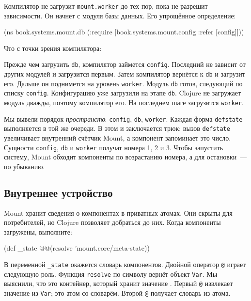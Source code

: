 
Компилятор не загрузит \verb|mount.worker| до тех пор, пока не разрешит
зависимости. Он начнет с модуля базы данных. Его упрощённое определение:

\begin{english}
  \begin{clojure}
(ns book.systems.mount.db
  (:require
   [book.systems.mount.config :refer [config]]))
  \end{clojure}
\end{english}

\noindent
Что с точки зрения компилятора:


Прежде чем загрузить \verb|db|, компилятор займется \verb|config|. Последний
не зависит от других модулей и загрузится первым. Затем компилятор вернётся к
\verb|db| и загрузит его. Дальше он поднимется на уровень
\verb|worker|. Модуль \verb|db| готов, следующий по списку
\verb|config|. Конфигурацию уже загрузили на этапе \verb|db|. Clojure не
загружает модуль дважды, поэтому компилятор его. На последнем шаге
загрузится \verb|worker|.


Мы вывели порядок \emph{пространств}: \verb|config|, \verb|db|,
\verb|worker|. Каждая форма \verb|defstate| выполняется в той же очереди. В
этом и заключается трюк: вызов \verb|defstate| увеличивает внутренний счётчик
Mount, а компонент запоминает это число. Сущности \verb|config|, \verb|db| и
\verb|worker| получат номера 1, 2 и 3. Чтобы запустить систему, Mount
обходит компоненты по возрастанию номера, а для остановки~--- по убыванию.

\subsection{Внутреннее устройство}

Mount хранит сведения о компонентах в приватных атомах. Они скрыты для
потребителей, но Clojure позволяет добраться до них. Когда компоненты загружены,
выполните:

\begin{english}
  \begin{clojure}
(def _state @@(resolve 'mount.core/meta-state))
  \end{clojure}
\end{english}


В переменной \verb|_state| окажется словарь компонентов. Двойной оператор
\verb|@| играет следующую роль. Функция \verb|resolve| по символу вернёт
объект \verb|Var|. Мы выяснили, что это контейнер, который хранит
значение . Первый \verb|@| извлекает значение из
\verb|Var|; это атом со словарём. Второй \verb|@| получает словарь из атома.

